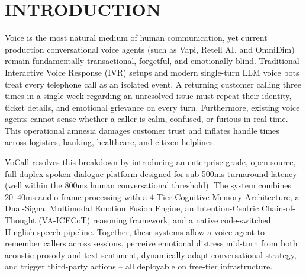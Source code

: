 \documentclass[12pt,a4paper]{article}
\begin{document}
\newpage
{
  \hypersetup{linkcolor=black}
  \tableofcontents
}

\newpage
{}
\setcounter{page}{6}

\section{INTRODUCTION}
Voice is the most natural medium of human communication, yet current production conversational voice agents (such as Vapi, Retell AI, and OmniDim) remain fundamentally transactional, forgetful, and emotionally blind. Traditional Interactive Voice Response (IVR) setups and modern single-turn LLM voice bots treat every telephone call as an isolated event. A returning customer calling three times in a single week regarding an unresolved issue must repeat their identity, ticket details, and emotional grievance on every turn. Furthermore, existing voice agents cannot sense whether a caller is calm, confused, or furious in real time. This operational amnesia damages customer trust and inflates handle times across logistics, banking, healthcare, and citizen helplines.

VoCall resolves this breakdown by introducing an enterprise-grade, open-source, full-duplex spoken dialogue platform designed for sub-500ms turnaround latency (well within the 800ms human conversational threshold). The system combines 20--40ms audio frame processing with a 4-Tier Cognitive Memory Architecture, a Dual-Signal Multimodal Emotion Fusion Engine, an Intention-Centric Chain-of-Thought (VA-ICECoT) reasoning framework, and a native code-switched Hinglish speech pipeline. Together, these systems allow a voice agent to remember callers across sessions, perceive emotional distress mid-turn from both acoustic prosody and text sentiment, dynamically adapt conversational strategy, and trigger third-party actions -- all deployable on free-tier infrastructure.

\end{document}
